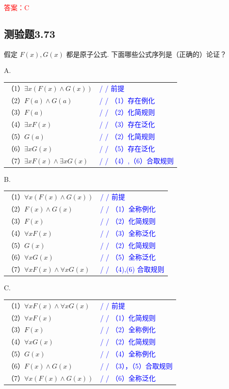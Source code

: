 \documentclass[UTF8, heading=true]{ctexart}
\begin{document}
\textcolor{red}{答案：C}

\subsection{测验题3.73}

假定 $F(x), G(x)$ 都是原子公式. 下面哪些公式序列是（正确的）论证？

A. 

\begin{tabular}{ll}
  （1）$\exists x(F(x) \wedge G(x))$ & \textcolor{blue}{/ / 前提} \\
  （2）$F(a) \wedge G(a)$ & \textcolor{blue}{/ / （1）存在例化} \\
  （3）$F(a)$ & \textcolor{blue}{/ / （2）化简规则} \\
  （4）$\exists x F(x)$ & \textcolor{blue}{/ / （3）存在泛化} \\
  （5）$G(a)$ & \textcolor{blue}{/ / （2）化简规则} \\
  （6）$\exists x G(x)$ & \textcolor{blue}{/ / （5）存在泛化} \\
  （7）$\exists x F(x) \wedge \exists x G(x)$ & \textcolor{blue}{/ / （4）,（6）合取规则}
\end{tabular}

B. 

\begin{tabular}{ll}
  （1）$\forall x(F(x) \wedge G(x))$ & \textcolor{blue}{/ / 前提} \\
  （2）$F(x) \wedge G(x)$ & \textcolor{blue}{/ / （1）全称例化} \\
  （3）$F(x)$ & \textcolor{blue}{/ / （2）化简规则} \\
  （4）$\forall x F(x)$ & \textcolor{blue}{/ / （3）全称泛化} \\
  （5）$G(x)$ & \textcolor{blue}{/ / （2）化简规则} \\
  （6）$\forall x G(x)$ & \textcolor{blue}{/ / （5）全称泛化} \\
  （7）$\forall x F(x) \wedge \forall x G(x)$ & \textcolor{blue}{/ / （4),(6) 合取规则}
  \end{tabular}

C. 

\begin{tabular}{ll}
  （1）$\forall x F(x) \wedge \forall x G(x)$ & \textcolor{blue}{/ / 前提} \\
  （2）$\forall x F(x)$ & \textcolor{blue}{/ / （1）化简规则} \\
  （3）$F(x)$ & \textcolor{blue}{/ / （2）全称例化} \\
  （4）$\forall x G(x)$ & \textcolor{blue}{/ / （2）化简规则} \\
  （5）$G(x)$ & \textcolor{blue}{/ / （4）全称例化} \\
  （6）$F(x) \wedge G(x)$ & \textcolor{blue}{/ / （3），（5）合取规则} \\
  （7）$\forall x(F(x) \wedge G(x))$ & \textcolor{blue}{/ / （6）全称泛化}
\end{tabular}
\end{document}
